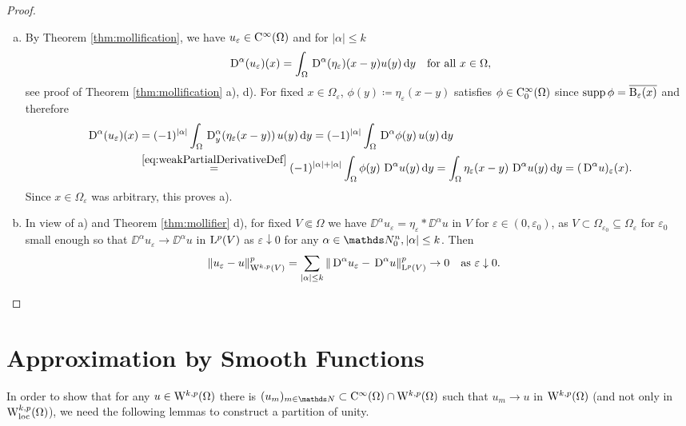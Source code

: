 \begin{proof}
  \begin{enumerate}[a)]
    \item By Theorem \ref{thm:mollification}, we have $u_\varepsilon \in \mathrm{C}^\infty(\Omega)$ and for $|\alpha| \leq k$
  $$
      \,{\operatorname{D}}^\alpha (u_\varepsilon)(x) = \int_\Omega \,{\operatorname{D}}^\alpha (\eta_\varepsilon)(x - y) u(y) \, {\operatorname{d}\!{y}} \quad\text{for all } x \in \Omega,
  $$
    see proof of Theorem \ref{thm:mollification} a), d).
    For fixed $x \in \Omega_\varepsilon$, $\phi(y) \coloneqq \eta_\varepsilon(x - y)$ satisfies $\phi \in \mathrm{C}_0^\infty(\Omega)$ since $\operatorname{supp} \phi = \overline{\mathrm{B}_\varepsilon(x)}$ and therefore
    \begin{align*}
      \,{\operatorname{D}}^\alpha (u_\varepsilon)(x) 
      &= (-1)^{|\alpha|} \int_\Omega \,{\operatorname{D}}_y^\alpha (\eta_\varepsilon (x - y))\, u(y) \, {\operatorname{d}\!{y}}
      = (-1)^{|\alpha|} \int_\Omega \,{\operatorname{D}}^\alpha \phi(y) \, u(y) \, {\operatorname{d}\!{y}} \\
      &\overset{\eqref{eq:weakPartialDerivativeDef}}{=} (-1)^{|\alpha| + |\alpha|} \int_\Omega \phi(y) \, \,{\operatorname{D}}^\alpha u(y) \, {\operatorname{d}\!{y}}
      = \int_\Omega \eta_\varepsilon(x - y)\, \,{\operatorname{D}}^\alpha u(y) \, {\operatorname{d}\!{y}}
      = (\,{\operatorname{D}}^\alpha u)_\varepsilon(x).
    \end{align*}
    Since $x \in \Omega_\varepsilon$ was arbitrary, this proves a).

  \item In view of a) and Theorem \ref{thm:mollifier} d), for fixed $V \Subset \Omega$ we have $\DD^\alpha u_\varepsilon = \eta_\varepsilon \ast \DD^\alpha u$ in $V$ for $\varepsilon \in (0,\varepsilon_0)$, as $V \subset \Omega_{\varepsilon_0} \subseteq \Omega_{\varepsilon}$ for $\varepsilon_0$ small enough so that $\DD^\alpha u_\varepsilon \to \DD^\alpha u$ in $\mathrm{L}^p(V)$ as $\varepsilon \downarrow 0$ for any $\alpha \in \N_0^n, |\alpha| \leq k$.
     Then
     \begin{align*}
     \|u_\varepsilon - u\|^p_{\mathrm{W}^{k,p}(V)} = \sum_{|\alpha| \leq k} \|\,{\operatorname{D}}^\alpha u_\varepsilon - \,{\operatorname{D}}^\alpha u\|_{\mathrm{L}^p(V)}^p \to 0 \quad\text{as } \varepsilon \downarrow 0. &\qedhere
   \end{align*}
 \end{enumerate}
\end{proof}

\section{Approximation by Smooth Functions}

In order to show that for any $u \in \mathrm{W}^{k,p}(\Omega)$ there is $(u_m)_{m \in \N} \subset \CC^\infty(\Omega) \cap \WW^{k,p}(\Omega)$ such that $u_m \to u$ in $\mathrm{W}^{k,p}(\Omega)$ (and not only in $\mathrm{W}^{k,p}_{\operatorname{loc}}(\Omega)$), we need the following lemmas to construct a partition of unity.

